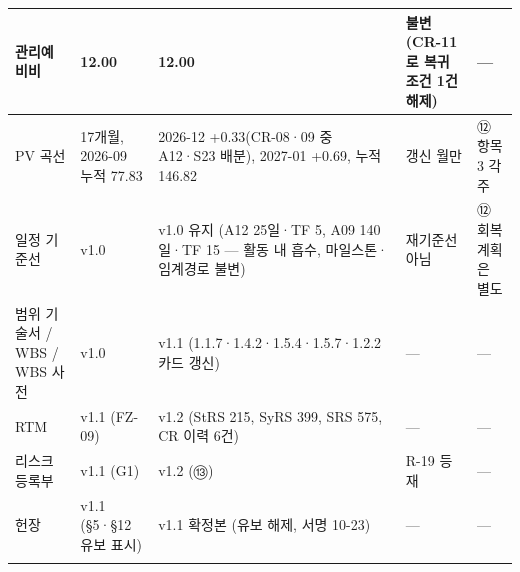 \documentclass[10pt,a4paper]{article}
\begin{document}
{\begin{tabularx}{\linewidth}{|L{34mm}|L{44mm}|L{52mm}|Y|L{50mm}|}
관리예비비 & 12.00 & 12.00 & 불변 (CR-11로 복귀 조건 1건 해제) & — \\ \hline
PV 곡선 & 17개월, 2026-09 누적 77.83 & 2026-12 +0.33(CR-08·09 중 A12·S23 배분), 2027-01 +0.69, 누적 146.82 & 갱신 월만 & ⑫ 항목 3 각주 \\ \hline
일정 기준선 & v1.0 & v1.0 유지 (A12 25일·TF 5, A09 140일·TF 15 — 활동 내 흡수, 마일스톤·임계경로 불변) & 재기준선 아님 & ⑫ 회복 계획은 별도 \\ \hline
범위 기술서 / WBS / WBS 사전 & v1.0 & v1.1 (1.1.7·1.4.2·1.5.4·1.5.7·1.2.2 카드 갱신) & — & — \\ \hline
RTM & v1.1 (FZ-09) & v1.2 (StRS 215, SyRS 399, SRS 575, CR 이력 6건) & — & — \\ \hline
리스크 등록부 & v1.1 (G1) & v1.2 (⑬) & R-19 등재 & — \\ \hline
헌장 & v1.1 (§5·§12 유보 표시) & v1.1 확정본 (유보 해제, 서명 10-23) & — & — \\ \hline
\fi
\end{tabularx}}
\end{document}
